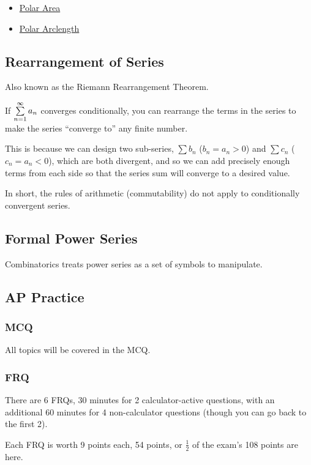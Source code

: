 \documentclass{article}
\begin{document}
\begin{itemize}
    \item \href{https://www.wolframalpha.com/widgets/view.jsp?id=769788ade06411e063edbd51239787f9}{Polar Area}
    \item \href{https://www.wolframalpha.com/widgets/view.jsp?id=c26cbb9457ff75f58f479364ddb79cd1}{Polar Arclength}
\end{itemize}

\subsection{Rearrangement of Series}
Also known as the Riemann Rearrangement Theorem.

If $\sum_{n=1}^{\infty}\limits a_n$ converges conditionally, you can rearrange the terms in the series to make the series ``converge to'' any finite number.

This is because we can design two sub-series, $\sum b_n$ ($b_n = a_n > 0$) and $\sum c_n$ ($c_n = a_n < 0$), which are both divergent, and so we can add precisely enough terms from each side so that the series sum will converge to a desired value.

In short, the rules of arithmetic (commutability) do not apply to conditionally convergent series.

\subsection{Formal Power Series}
Combinatorics treats power series as a set of symbols to manipulate.

\subsection{AP Practice}
\subsubsection{MCQ}
All topics will be covered in the MCQ.

\subsubsection{FRQ}
There are 6 FRQs, 30 minutes for 2 calculator-active questions, with an additional 60 minutes for 4 non-calculator questions (though you can go back to the first 2).

Each FRQ is worth 9 points each, 54 points, or $\frac{1}{2}$ of the exam's 108 points are here.
\end{document}
